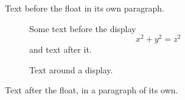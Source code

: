 \documentclass[10pt]{article}
\begin{document}
Text before the float in its own paragraph.

\begin{figure}[h]
Some text before the display
\[ x^2 + y^2 = z^2 \]
and text after it.
\caption{Text around a display.}
\end{figure}

Text after the float, in a paragraph of its own.
\end{document}
